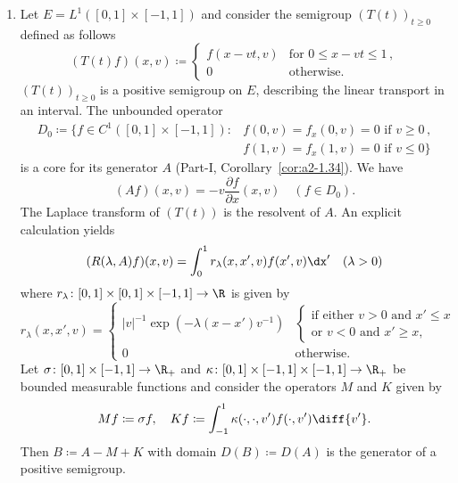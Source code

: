 \begin{examples}
\begin{enumerate}[\upshape (i), wide, labelindent=.25em]
	\item 
	Let $E = L^{1}([0,1]\times[-1,1])$ and consider the semigroup $(T(t))_{t\geq 0}$ defined as follows
	\begin{equation}\label{eq:c3-3.3}
		(T(t)f)(x,v) \coloneqq \begin{cases}
			f(x-vt,v) & \text{for } 0 \leq x-vt \leq 1 \,,\\
			0 & \text{otherwise}.
		\end{cases}
	\end{equation}
		$(T(t))_{t\geq 0}$ is a positive semigroup on $E$, describing the linear transport%
        in an interval. The unbounded operator 
	\begin{align*}\label{eq:c3-D0}
		D_{0} \coloneqq \{f \in C^{1}([0,1]\times[-1,1]) \colon  
		& f(0,v) = f_{x}(0,v) = 0 \text{ if } v \geq 0\,,\\ 
		& f(1,v) = f_{x}(1,v) = 0 \text{ if } v \leq 0\}
	\end{align*}
	is a core%
    for its generator $A$ (\cf Part-I, Corollary~\ref{cor:a2-1.34}).
	We have
	\begin{equation}\label{eq:c3-3.4}
		(Af)(x,v) = -v\frac{\partial f}{\partial x}(x,v) \quad (f \in D_{0}).
	\end{equation}
	The Laplace transform of\/ $(T(t))$ is the resolvent of\/ $A$.
	An explicit calculation yields
	\begin{equation}\label{eq:c3-3.5}
		(R(\lambda,A)f)(x,v) = \int_{0}^{1} r_{\lambda}(x,x',v)f(x',v)\dx' \quad (\lambda > 0)
	\end{equation}
	where $r_{\lambda} \colon [0,1] \times [0,1] \times [-1,1] \to \R $ is given by
	\begin{equation*}\label{eq:c3-r_lambda}
		r_{\lambda}(x,x',v) = \begin{cases}
			|v|^{-1}\exp(-\lambda(x-x')v^{-1}) & 
			\begin{cases}\text{if either } v>0 \text{ and } x'\leq x \\
		    \text{or } v<0 \text{ and } x'\geq x, 
		    \end{cases}\\
			0 & \text{otherwise}.
		\end{cases}
	\end{equation*}
	Let $\sigma \colon [0,1]\times[-1,1] \to \R _{+}$ and $\kappa \colon [0,1]\times[-1,1]\times[-1,1] \to \R _{+}$ be bounded measurable functions and consider the operators $M$ and $K$ given by
	\begin{equation}\label{eq:c3-3.6}
		Mf \coloneqq \sigma f, \quad Kf \coloneqq \int_{-1}^{1} \kappa(\cdot,\cdot,v')f(\cdot,v') \diff{v'}.
	\end{equation}
	Then $B \coloneqq A - M + K$ with domain $D(B) \coloneqq D(A)$ is the generator of a positive semigroup.
	

\end{enumerate}
\end{examples}
